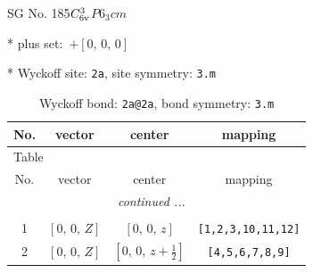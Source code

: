 \documentclass[fleqn,8pt]{jsarticle}
\begin{document}
\setcounter{MaxMatrixCols}{32}

\renewcommand{\tablename}{Table~}
\renewcommand{\figurename}{Figure~}
\begin{center}
\LARGE
SG No. 185\quad$C_{\rm 6v}^{3}$\quad$P6_3cm$\quad[ hexagonal ]
\end{center}

* plus set:\,\,\,$+\left[ 0,\, 0,\, 0 \right]$


* Wyckoff site: {\tt 2a}, site symmetry: {\tt 3.m}
\renewcommand{\arraystretch}{1.2}
\begin{longtable}{cccc}
\caption{Wyckoff bond: {\tt 2a@2a}, bond symmetry: {\tt 3.m}}
 \\
 \hline \hline
No. & vector & center & mapping \\ \hline \endfirsthead

\multicolumn{3}{l}{\tablename\ \thetable{}} \\
 \hline \hline
No. & vector & center & mapping \\ \hline \endhead

 \hline \hline
\multicolumn{3}{r}{\footnotesize\it continued ...} \\ \endfoot

 \hline \hline
\multicolumn{3}{r}{} \\ \endlastfoot

1 & $\left[ 0,\, 0,\, Z \right]$ & $\left[ 0,\, 0,\, z \right]$ & {\tt [1,2,3,10,11,12]} \\ \hline
2 & $\left[ 0,\, 0,\, Z \right]$ & $\left[ 0,\, 0,\, z + \frac{1}{2} \right]$ & {\tt [4,5,6,7,8,9]} \\
\end{longtable}
\renewcommand{\arraystretch}{1.2}
\end{document}
